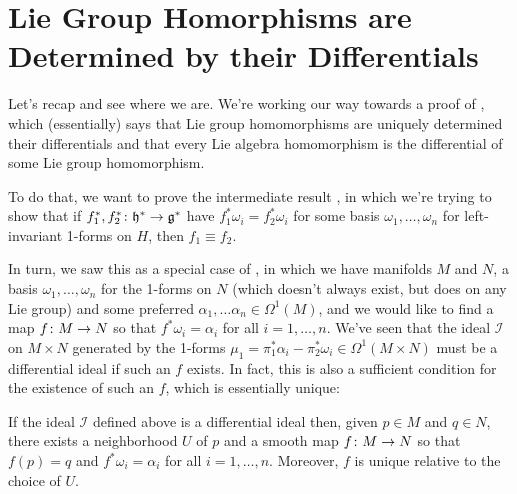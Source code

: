 
\section{Lie Group Homorphisms are Determined by their Differentials}
\label{sec:lie group homomorphisms and differentials}

Let's recap and see where we are. We're working our way towards a proof of , which (essentially) says that Lie group homomorphisms are uniquely determined their differentials and that every Lie algebra homomorphism is the differential of some Lie group homomorphism.

To do that, we want to prove the intermediate result , in which we're trying to show that if $f_1^\ast, f_2^\ast \colon\thinspace\! \mathfrak{h}^\ast \to \mathfrak{g}^\ast$ have $f_1^\ast \omega_i = f_2^\ast \omega_i$ for some basis $\omega_1, \dots , \omega_n$ for left-invariant 1-forms on $H$, then $f_1 \equiv f_2$.

In turn, we saw this as a special case of , in which we have manifolds $M$ and $N$, a basis $\omega_1, \dots , \omega_n$ for the 1-forms on $N$ (which doesn't always exist, but does on any Lie group) and some preferred $\alpha_1 , \dots \alpha_n \in \Omega^1(M)$, and we would like to find a map $f \colon\thinspace\! M \to N$ so that $f^\ast \omega_i = \alpha_i$ for all $i=1, \dots , n$. We've seen that the ideal $\mathcal{I}$ on $M \times N$ generated by the 1-forms $\mu_1 = \pi_1^\ast \alpha_i - \pi_2^\ast \omega_i \in \Omega^1(M \times N)$ must be a differential ideal if such an $f$ exists. In fact, this is also a sufficient condition for the existence of such an $f$, which is essentially unique:

\begin{theorem}\label{thm:map with specified forms}
	If the ideal $\mathcal{I}$ defined above is a differential ideal then, given $p \in M$ and $q \in N$, there exists a neighborhood $U$ of $p$ and a smooth map $f \colon\thinspace\! M \to N$ so that $f(p) = q$ and $f^\ast \omega_i = \alpha_i$ for all $i=1,\dots , n$. Moreover, $f$ is unique relative to the choice of $U$.
\end{theorem}

